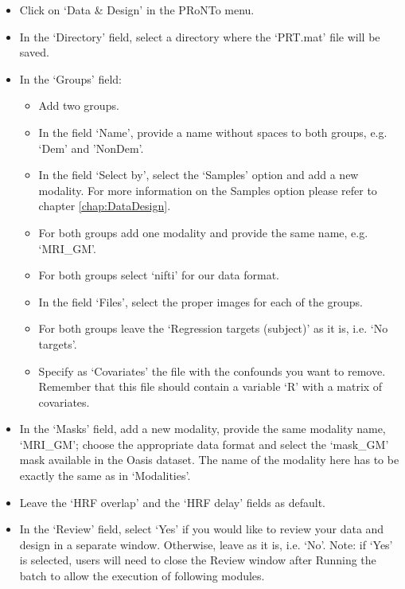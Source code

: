 \begin{itemize}

 	\item Click on `Data \& Design' in the PRoNTo menu.
 	
	\item In the `Directory' field, select a directory where the `PRT.mat' file will be saved.
	
	\item In the `Groups' field:
 	
		\begin{itemize}
		
		\item Add two groups.
		
		\item In the field `Name', provide a name without spaces to both groups, e.g. `Dem' and 'NonDem'. 
		
		\item In the field `Select by', select the `Samples' option and add a new modality. For more information on the Samples option please refer to chapter \ref{chap:DataDesign}.
		
		\item For both groups add one modality and provide the same name, e.g. `MRI\_GM'.
		
		\item For both groups select `nifti' for our data format.
		
		\item In the field `Files', select the proper images for each of the groups.	
		
		\item For both groups leave the `Regression targets (subject)' as it is, i.e. `No targets'.
		
		\item Specify as `Covariates' the file with the confounds you want to remove. Remember that this file should contain a variable `R' with a matrix of covariates.
	
	\end{itemize}
	
	\item In the `Masks' field, add a new modality, provide the same modality name, `MRI\_GM'; choose the appropriate data format and select the `mask\_GM' mask available in the Oasis dataset. The name of the modality here has to be exactly the same as in `Modalities'.
	
	\item Leave the `HRF overlap' and the `HRF delay' fields as default.
	
	\item In the `Review' field, select `Yes' if you would like to review your data and design in a separate window. Otherwise, leave as it is, i.e. `No'. Note: if `Yes' is selected, users will need to close the Review window after Running the batch to allow the execution of following modules.

\end{itemize}

